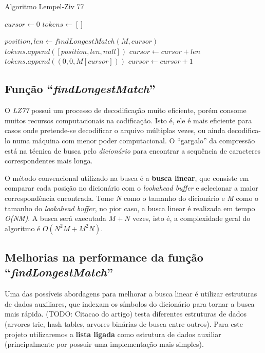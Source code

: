 \begin{algorithm}[H]
\caption{Algoritmo Lempel-Ziv 77} \label{alg:lz77}
\begin{algorithmic}

	\State $cursor \gets 0$
	\State $tokens \gets []$

		\State $position, len \gets findLongestMatch(M, cursor)$ 
		 
			\State $tokens.append([position, len, null])$
			\State $cursor \gets cursor + len$
		\Else
			\State $tokens.append((0, 0, M[cursor]))$ 
			\State $cursor \gets cursor + 1$
		\EndIf
	\EndWhile
\end{algorithmic}
\end{algorithm}

\subsection{Função ``\emph{findLongestMatch}'' }
O \emph{LZ77} possui um processo de decodificação muito eficiente, porém consome muitos recursos computacionais na codificação. 
Isto é, ele é mais eficiente para casos onde pretende-se decodificar o arquivo múltiplas vezes, ou ainda decodifica-lo numa máquina com menor poder computacional. O ``gargalo'' da compressão está na técnica de busca pelo \emph{dicionário} para encontrar a sequência de caracteres correspondentes mais longa.

O método convencional utilizado na busca é a \textbf{busca linear}, que consiste em comparar cada posição no dicionário com o \emph{lookahead buffer} e selecionar a maior correspondência encontrada. 
Tome \emph{N} como o tamanho do dicionário e \emph{M} como o tamanho do \emph{lookahead buffer}, no pior caso, a busca linear é realizada em tempo \emph{O(NM)}. 
A busca será executada $M + N$ vezes, isto é, a complexidade geral do algoritmo é $O( N^{2}M + M^{2}N)$.

\subsection{Melhorias na performance da função ``\emph{findLongestMatch}'' }

Uma das possíveis abordagens para melhorar a busca linear é utilizar estruturas de dados auxiliares, que indexam os símbolos do dicionário para tornar a busca mais rápida.
(TODO: Citacao do artigo) testa diferentes estruturas de dados (arvores trie, hash tables, arvores binárias de busca entre outros). Para este projeto utilizaremos a \textbf{lista ligada} como estrutura de dados auxiliar (principalmente por possuir uma implementação mais simples). 

